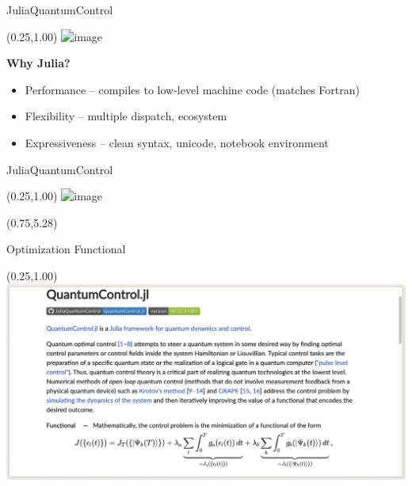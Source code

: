 \documentclass[compress, aspectratio=169,usepdftitle=false]{beamer}
\begin{document}
\begin{frame}{JuliaQuantumControl}
  \begin{textblock}{15.5}(0.25,1.00)
    \includegraphics<2>[width=\textwidth]{images/JuliaQuantumControl}
  \end{textblock}
\end{frame}


\begin{frame}
  \begin{center}
    {\Large \color{DarkRed} \bf Why Julia?}
    \vspace{1.5cm}
    \pause
    \begin{itemize}
      \item Performance \pause -- compiles to low-level machine code (matches Fortran) \pause
      \item Flexibility \pause -- multiple dispatch\pause, ecosystem\pause
      \item Expressiveness \pause -- clean syntax, unicode, notebook environment
    \end{itemize}
  \end{center}
\end{frame}


\begin{frame}{JuliaQuantumControl}
  \begin{textblock}{15.5}(0.25,1.00)
    \includegraphics<1->[width=\textwidth]{images/JuliaQuantumControl.png}
  \end{textblock}
  \begin{textblock}{14.5}(0.75,5.28)
  \end{textblock}
\end{frame}

\begin{frame}{Optimization Functional}
  \begin{textblock}{15.5}(0.25,1.00)
    \includegraphics[width=\textwidth]{images/functional.png}
  \end{textblock}
\end{frame}
\end{document}
